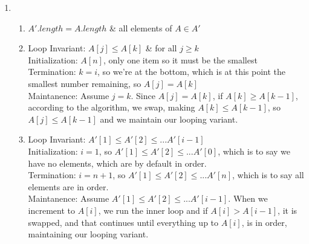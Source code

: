 \documentclass{article}
\begin{document}
\begin{enumerate}
\item
    \begin{enumerate}[label=(\alph*)]
        \item \(A'.length = A.length\) \& all elements of \(A \in A'\)\medskip
        \item Loop Invariant: \(A[j] \leq A[k]\) \& for all \(j \geq k\)\bigskip
        \\Initialization: \(A[n]\), only one item so it must be the smallest\medskip
        \\Termination: \(k = i\), so we're at the bottom, which is at this point the smallest number remaining, so \(A[j] = A[k]\)\medskip
        \\Maintanence: Assume \(j = k\). Since \(A[j] = A[k]\), if \(A[k] \geq A[k - 1]\), according to the algorithm, we swap, making \(A[k] \leq A[k - 1]\), so \(A[j] \leq A[k - 1]\) and we maintain our looping variant.\medskip
        \item Loop Invariant: \(A'[1] \leq A'[2] \leq ... A'[i - 1]\)\bigskip
        \\Initialization: \(i = 1\), so \(A'[1] \leq A'[2] \leq ... A'[0]\), which is to say we have no elements, which are by default in order.\medskip
        \\Termination: \(i = n + 1\), so \(A'[1] \leq A'[2] \leq ... A'[n]\), which is to say all elements are in order.\medskip
        \\Maintanence: Assume \(A'[1] \leq A'[2] \leq ... A'[i - 1]\). When we increment to \(A[i]\), we run the inner loop and if \(A[i] > A[i -1]\), it is swapped, and that continues until everything up to  \(A[i]\), is in order, maintaining our looping variant.
    \end{enumerate}
    

\end{enumerate}
\end{document}
